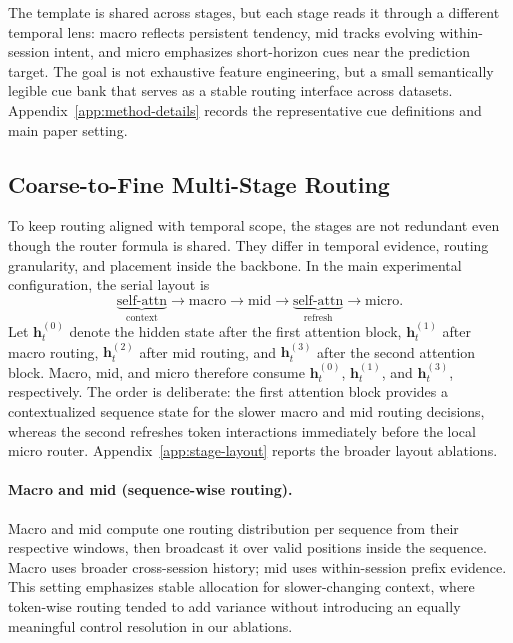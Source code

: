 \documentclass[sigconf,review,anonymous]{acmart}
\begin{document}
The template is shared across stages, but each stage reads it through a different temporal lens: macro reflects persistent tendency, mid tracks evolving within-session intent, and micro emphasizes short-horizon cues near the prediction target. The goal is not exhaustive feature engineering, but a small semantically legible cue bank that serves as a stable routing interface across datasets. Appendix~\ref{app:method-details} records the representative cue definitions and main paper setting.

\subsection{Coarse-to-Fine Multi-Stage Routing}
\label{sec:multi-stage-routing}

To keep routing aligned with temporal scope, the stages are not redundant even though the router formula is shared. They differ in temporal evidence, routing granularity, and placement inside the backbone. In the main experimental configuration, the serial layout is
\[
\underbrace{\text{self-attn}}_{\text{context}} \to \text{macro} \to \text{mid} \to \underbrace{\text{self-attn}}_{\text{refresh}} \to \text{micro}.
\]
Let $\mathbf{h}^{(0)}_t$ denote the hidden state after the first attention block, $\mathbf{h}^{(1)}_t$ after macro routing, $\mathbf{h}^{(2)}_t$ after mid routing, and $\mathbf{h}^{(3)}_t$ after the second attention block. Macro, mid, and micro therefore consume $\mathbf{h}^{(0)}_t$, $\mathbf{h}^{(1)}_t$, and $\mathbf{h}^{(3)}_t$, respectively. The order is deliberate: the first attention block provides a contextualized sequence state for the slower macro and mid routing decisions, whereas the second refreshes token interactions immediately before the local micro router. Appendix~\ref{app:stage-layout} reports the broader layout ablations.

\paragraph{Macro and mid (sequence-wise routing).}
Macro and mid compute one routing distribution per sequence from their respective windows, then broadcast it over valid positions inside the sequence. Macro uses broader cross-session history; mid uses within-session prefix evidence. This setting emphasizes stable allocation for slower-changing context, where token-wise routing tended to add variance without introducing an equally meaningful control resolution in our ablations.
\end{document}
